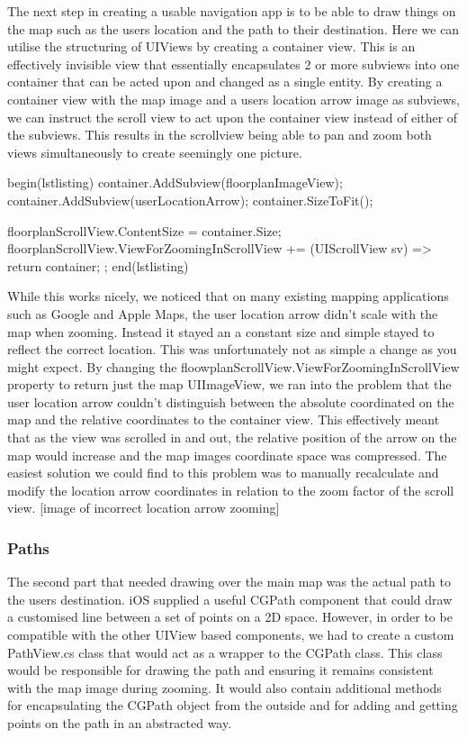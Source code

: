 \documentclass[main.tex]{subfiles}
\begin{document}
The next step in creating a usable navigation app is to be able to draw things on the map such as the users location and the path to their destination. Here we can utilise the structuring of UIViews by creating a container view. This is an effectively invisible view that essentially encapsulates 2 or more subviews into one container that can be acted upon and changed as a single entity. By creating a container view with the map image and a users location arrow image as subviews, we can instruct the scroll view to act upon the container view instead of either of the subviews. This results in the scrollview being able to pan and zoom both views simultaneously to create seemingly one picture. 

begin(lstlisting)
container.AddSubview(floorplanImageView);
container.AddSubview(userLocationArrow);
container.SizeToFit();

floorplanScrollView.ContentSize = container.Size;
floorplanScrollView.ViewForZoomingInScrollView += (UIScrollView sv) => { return container; };
end(lstlisting)

While this works nicely, we noticed that on many existing mapping applications such as Google and Apple Maps, the user location arrow didn’t scale with the map when zooming. Instead it stayed an a constant size and simple stayed to reflect the correct location. This was unfortunately not as simple a change as you might expect. By changing the floowplanScrollView.ViewForZoomingInScrollView property to return just the map UIImageView, we ran into the problem that the user location arrow couldn’t distinguish between the absolute coordinated on the map and the relative coordinates to the container view. This effectively meant that as the view was scrolled in and out, the relative position of the arrow on the map would increase and the map images coordinate space was compressed. The easiest solution we could find to this problem was to manually recalculate and modify the location arrow coordinates in relation to the zoom factor of the scroll view.
[image of incorrect location arrow zooming]

\subsubsection{Paths}

The second part that needed drawing over the main map was the actual path to the users destination. iOS supplied a useful CGPath component that could draw a customised line between a set of points on a 2D space. However, in order to be compatible with the other UIView based components, we had to create a custom PathView.cs class that would act as a wrapper to the CGPath class. This class would be responsible for drawing the path and ensuring it remains consistent with the map image during zooming. It would also contain additional methods for encapsulating the CGPath object from the outside and for adding and getting points on the path in an abstracted way. 
\end{document}
